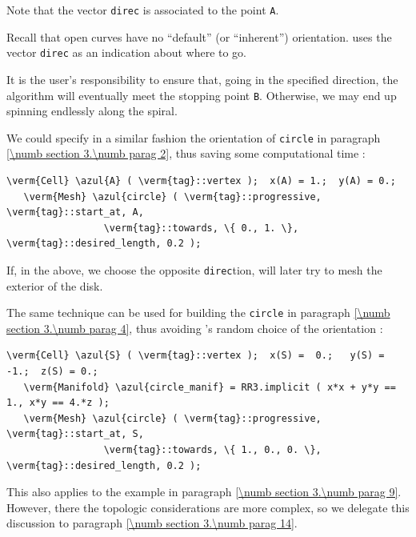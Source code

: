Note that the vector {\small\tt direc} is associated to the point {\small\tt A}.

Recall that open curves have no ``default'' (or ``inherent'') orientation.
{\ManiFEM} uses the vector {\small\tt direc} as an indication about where to go.

It is the user's responsibility to ensure that, going in the specified direction,
the algorithm will eventually meet the stopping point {\small\tt B}.
Otherwise, we may end up spinning endlessly along the spiral.

We could specify in a similar fashion the orientation of {\small\tt circle} in paragraph
\ref{\numb section 3.\numb parag 2}, thus saving some computational time :

\begin{Verbatim}[commandchars=\\\{\},formatcom=\small\tt,
   baselinestretch=0.94,framesep=2mm                                            ]
   \verm{Cell} \azul{A} ( \verm{tag}::vertex );  x(A) = 1.;  y(A) = 0.;
   \verm{Mesh} \azul{circle} ( \verm{tag}::progressive, \verm{tag}::start_at, A,
                 \verm{tag}::towards, \{ 0., 1. \}, \verm{tag}::desired_length, 0.2 );
\end{Verbatim}

If, in the above, we choose the opposite {\small\tt direc}tion,
{\maniFEM} will later try to mesh the exterior of the disk.

The same technique can be used for building the {\small\tt circle} in paragraph
\ref{\numb section 3.\numb parag 4}, thus avoiding \maniFEM's random choice of the orientation :

\begin{Verbatim}[commandchars=\\\{\},formatcom=\small\tt,
   baselinestretch=0.94,framesep=2mm                     ]
   \verm{Cell} \azul{S} ( \verm{tag}::vertex );  x(S) =  0.;   y(S) = -1.;  z(S) = 0.;
   \verm{Manifold} \azul{circle_manif} = RR3.implicit ( x*x + y*y == 1., x*y == 4.*z );
   \verm{Mesh} \azul{circle} ( \verm{tag}::progressive, \verm{tag}::start_at, S,
                 \verm{tag}::towards, \{ 1., 0., 0. \}, \verm{tag}::desired_length, 0.2 );
\end{Verbatim}

This also applies to the example in paragraph \ref{\numb section 3.\numb parag 9}.
However, there the topologic considerations are more complex, so we delegate this
discussion to paragraph \ref{\numb section 3.\numb parag 14}.


